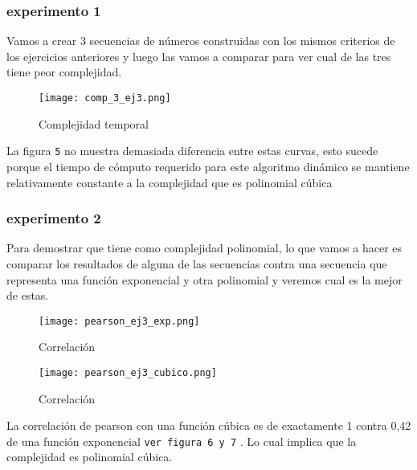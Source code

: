 \subsubsection {experimento 1}
Vamos a crear 3 secuencias de números construidas con los mismos criterios de los ejercicios anteriores y luego las vamos a comparar para ver cual de las tres tiene peor complejidad.
\begin{figure}[h]
    \centering
    \texttt{[image: comp\_3\_ej3.png]}
    \caption{Complejidad temporal}
    \label{fig:mesh1}
\end{figure}

La figura \texttt{5} no muestra demasiada diferencia entre estas curvas, esto sucede porque el tiempo de cómputo requerido para este algoritmo dinámico
se mantiene relativamente constante a la complejidad que es polinomial cúbica

\subsubsection {experimento 2}
Para demostrar que tiene como complejidad polinomial, lo que vamos a hacer es comparar los resultados de alguna de las secuencias contra una
secuencia que representa una función exponencial y otra polinomial y veremos cual es la mejor de estas.
\begin{figure}[h]
    \centering
    \texttt{[image: pearson\_ej3\_exp.png]}
    \caption{Correlación}
    \label{fig:mesh1}
\end{figure}

\begin{figure}[h]
    \centering
    \texttt{[image: pearson\_ej3\_cubico.png]}
    \caption{Correlación}
    \label{fig:mesh1}
\end{figure}

La correlación de pearson con una función cúbica es de exactamente 1 contra 0,42 de una función exponencial \texttt{ver figura 6 y 7} . Lo cual implica que
la complejidad es polinomial cúbica.
